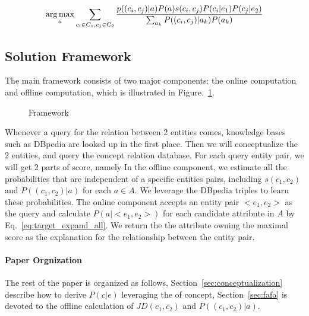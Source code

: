 \begin{equation}
\label{eq:target_expand_all}
\begin{split}
 \operatorname*{arg\,max}_a \sum_{c_i\in C_1, c_j\in C_2}\frac{ p((c_{i},c_{j})|a) P(a) s(c_i,c_j) P(c_i|e_1) P(c_j|e_2) }{ \sum_{a_k}{P( (c_{i},c_{j})|a_k) P(a_k)   } }
\end{split}
\end{equation}



\subsection{Solution Framework}
The main framework consists of two major components: the online computation and offline computation, which is illustrated in Figure.~\ref{fig:framework}.

\begin{figure}[!hptb]
\label{fig:framework}
\centering
{}
\caption{Framework }
\end{figure}

Whenever a query for the relation between 2 entities comes, knowledge bases such as DBpedia are looked up in the first place.
Then we will conceptualize the 2 entities, and query the concept relation database. For each query entity pair, we will get 2 parts of score, namely
In the offline component, we estimate all the probabilities that are independent of a specific entities pairs, including $s(c_1,c_2)$ and $P((c_{1},c_{2})|a)$ for each $a\in A$.
We leverage the DBpedia triples to learn these probabilities.
The online component accepts an entity pair $<e_1, e_2>$ as the query and calculate $ P(a| <e_1,e_2> )$ for each candidate attribute in $A$ by Eq.~\ref{eq:target_expand_all}. We return the the attribute owning the maximal score as the explanation for the relationship between the entity pair.




\paragraph{Paper Orgnization}
The rest of the paper is organized as follows, Section~\ref{sec:conceptualization} describe how to derive $P(c|e)$ leveraging the  of concept, Section~\ref{sec:fafa} is devoted to the offline calculation of $JD(c_1,c_2)$ and $P((c_{1},c_{2})|a)$.


